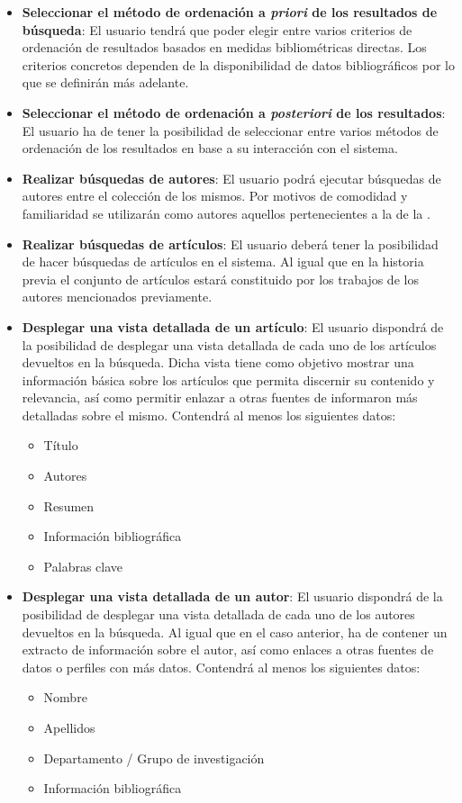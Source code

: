 \begin{itemize}
	\item \textbf{Seleccionar el método de ordenación a \textit{priori} de los resultados de búsqueda}: El usuario tendrá que poder elegir entre varios criterios de ordenación de resultados basados en medidas bibliométricas directas. Los criterios concretos dependen de la disponibilidad de datos bibliográficos por lo que se definirán más adelante.
	
	\item \textbf{Seleccionar el método de ordenación a \textit{posteriori} de los resultados}: El usuario ha de tener la posibilidad de seleccionar entre varios métodos de ordenación de los resultados en base a su interacción con el sistema.

	\item \textbf{Realizar búsquedas de autores}: El usuario podrá ejecutar búsquedas de autores entre el colección de los mismos. Por motivos de comodidad y familiaridad se utilizarán como autores aquellos pertenecientes a la \myFaculty de la \myUni.
	
	\item \textbf{Realizar búsquedas de artículos}: El usuario deberá tener la posibilidad de hacer búsquedas de artículos en el sistema. Al igual que en la historia previa el conjunto de artículos estará constituido por los trabajos de los autores mencionados previamente.
	
	\item \textbf{Desplegar una vista detallada de un artículo}: El usuario dispondrá de la posibilidad de desplegar una vista detallada de cada uno de los artículos devueltos en la búsqueda. Dicha vista tiene como objetivo mostrar una información básica sobre los artículos que permita discernir su contenido y relevancia, así como permitir enlazar a otras fuentes de informaron más detalladas sobre el mismo. Contendrá al menos los siguientes datos:
	\begin{itemize}
		\item[\textendash] Título
		\item[\textendash] Autores
		\item[\textendash] Resumen
		\item[\textendash] Información bibliográfica
		\item[\textendash] Palabras clave
	\end{itemize}
	
	\item \textbf{Desplegar una vista detallada de un autor}:  El usuario dispondrá de la posibilidad de desplegar una vista detallada de cada uno de los autores devueltos en la búsqueda. Al igual que en el caso anterior, ha de contener un extracto de información sobre el autor, así como enlaces a otras fuentes de datos o perfiles con más datos. Contendrá al menos los siguientes datos:
	\begin{itemize}
		\item[\textendash] Nombre
		\item[\textendash] Apellidos
		\item[\textendash] Departamento / Grupo de investigación
		\item[\textendash] Información bibliográfica


\end{itemize}
\end{itemize}
